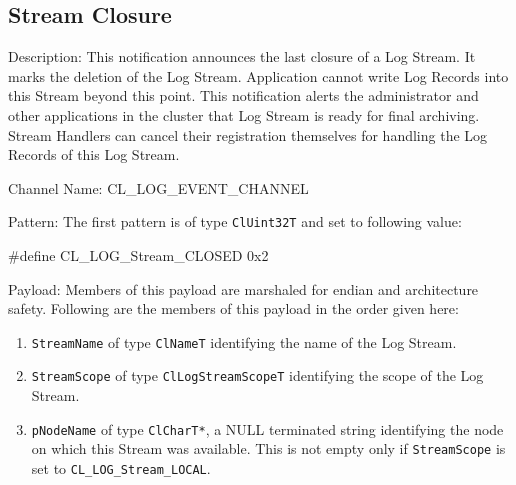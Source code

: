 \begin{flushleft}
\subsection{Stream Closure}
\begin{Desc}
\item[Description:]
This notification announces the last closure of a Log Stream. It marks the deletion of the Log Stream. Application cannot write Log Records into this 
Stream beyond this point. This notification alerts the administrator and other applications in the cluster that Log Stream is ready for final 
archiving. Stream Handlers can cancel their registration themselves for handling the Log Records of this Log Stream.
\end{Desc}
\begin{Desc}
\item[Channel Name:]
CL\_\-LOG\_\-EVENT\_\-CHANNEL
\end{Desc}
\begin{Desc}
\item[Pattern:]
The first pattern is of type {\tt{ClUint32T}} and set to following value:
\par
\#define CL\_\-LOG\_\-Stream\_\-CLOSED	0x2
\end{Desc}
\begin{Desc}
\item[Payload:]
Members of this payload are marshaled for endian and architecture safety. Following are the members of this payload in the order given here:
\begin{enumerate}
\item
{\tt{StreamName}} of type {\tt{ClNameT}} identifying the name of the Log Stream.
\item
{\tt{StreamScope}} of type {\tt{ClLogStreamScopeT}} identifying the scope of the Log Stream.
\item
{\tt{pNodeName}} of type {\tt{ClCharT*}}, a NULL terminated string identifying the node on which this Stream was available. This is not empty only if
{\tt{StreamScope}} is set to {\tt{CL\_\-LOG\_\-Stream\_\-LOCAL}}.
\end{enumerate}
\end{Desc}




\end{flushleft}
